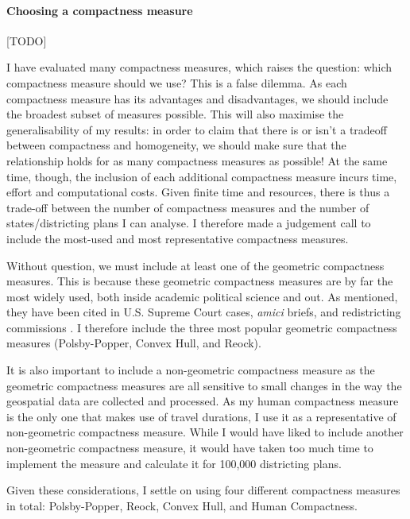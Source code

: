 \documentclass[]{article}
\let\oldparagraph\paragraph
\renewcommand{\paragraph}[1]{\oldparagraph{#1}\mbox{}}
\begin{document}
\hypertarget{choosing-a-compactness-measure}{%
\paragraph{Choosing a compactness
measure}\label{choosing-a-compactness-measure}}

{[}TODO{]}

I have evaluated many compactness measures, which raises the question:
which compactness measure should we use? This is a false dilemma. As
each compactness measure has its advantages and disadvantages, we should
include the broadest subset of measures possible. This will also
maximise the generalisability of my results: in order to claim that
there is or isn't a tradeoff between compactness and homogeneity, we
should make sure that the relationship holds for as many compactness
measures as possible! At the same time, though, the inclusion of each
additional compactness measure incurs time, effort and computational
costs. Given finite time and resources, there is thus a trade-off
between the number of compactness measures and the number of
states/districting plans I can analyse. I therefore made a judgement
call to include the most-used and most representative compactness
measures.

Without question, we must include at least one of the geometric
compactness measures. This is because these geometric compactness
measures are by far the most widely used, both inside academic political
science and out. As mentioned, they have been cited in U.S. Supreme
Court cases, \emph{amici} briefs, and redistricting commissions
\citep{moncrief2011}. I therefore include the three most popular
geometric compactness measures (Polsby-Popper, Convex Hull, and Reock).

It is also important to include a non-geometric compactness measure as
the geometric compactness measures are all sensitive to small changes in
the way the geospatial data are collected and processed. As my human
compactness measure is the only one that makes use of travel durations,
I use it as a representative of non-geometric compactness measure. While
I would have liked to include another non-geometric compactness measure,
it would have taken too much time to implement the measure and calculate
it for 100,000 districting plans.

Given these considerations, I settle on using four different compactness
measures in total: Polsby-Popper, Reock, Convex Hull, and Human
Compactness.
\end{document}

